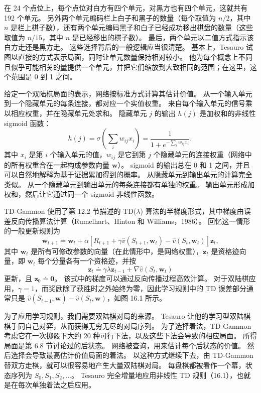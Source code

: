 \documentclass[UTF8,12pt,a4paper,fontset=fandol]{ctexart}
\begin{document}
在 24 个点位上，每个点位对白方有四个单元，对黑方也有四个单元，这就共有 192 个单元。
另外两个单元编码栏上白子和黑子的数量（每个取值为 $n/2$，其中 $n$ 是栏上棋子数），还有两个单元编码黑子和白子已经成功移出棋盘的数量（这些取值为 $n/15$，其中 $n$ 是已经移出的棋子数）。
最后，两个单元以二值方式指示该白方走还是黑方走。
这些选择背后的一般逻辑应当很清楚。
基本上，Tesauro 试图以直接的方式表示局面，同时让单元数量保持相对较小。
他为每个概念上不同且似乎可能相关的量提供一个单元，并把它们缩放到大致相同的范围；在这里，这个范围是 0 到 1 之间。

给定一个双陆棋局面的表示，网络按标准方式计算其估计价值。
从一个输入单元到一个隐藏单元的每条连接，都对应一个实值权重。
来自每个输入单元的信号乘以相应权重，并在隐藏单元处求和。
隐藏单元 $j$ 的输出 $h(j)$ 是加权和的非线性 sigmoid 函数：
\[
h(j)=\sigma\left(\sum_i w_{ij}x_i\right)
=\frac{1}{1+e^{-\sum_i w_{ij}x_i}},
\]
其中 $x_i$ 是第 $i$ 个输入单元的值，$w_{ij}$ 是它到第 $j$ 个隐藏单元的连接权重（网络中的所有权重合在一起构成参数向量 $\mathbf{w}$）。
sigmoid 的输出总在 0 和 1 之间，并且可以自然地解释为基于证据累加得到的概率。
从隐藏单元到输出单元的计算完全类似。
从一个隐藏单元到输出单元的每条连接都有单独的权重。
输出单元形成加权和，然后让它通过同一个 sigmoid 非线性函数。

TD-Gammon 使用了第 12.2 节描述的 TD($\lambda$) 算法的半梯度形式，其中梯度由误差反向传播算法计算（Rumelhart、Hinton 和 Williams，1986）。
回忆这一情形的一般更新规则为
\begin{equation}
\mathbf{w}_{t+1}\doteq \mathbf{w}_t+\alpha\left[R_{t+1}+\gamma\hat v(S_{t+1},\mathbf{w}_t)-\hat v(S_t,\mathbf{w}_t)\right]\mathbf{z}_t,
\tag{16.1}
\end{equation}
其中 $\mathbf{w}_t$ 是所有可修改参数的向量（在此情形中，是网络权重），$\mathbf{z}_t$ 是资格迹向量，即 $\mathbf{w}_t$ 每个分量各有一个资格迹，并按
\[
\mathbf{z}_t\doteq \gamma\lambda\mathbf{z}_{t-1}+\nabla\hat v(S_t,\mathbf{w}_t)
\]
更新，且 $\mathbf{z}_0\doteq \mathbf{0}$。
该式中的梯度可以通过反向传播过程高效计算。
对于双陆棋应用，$\gamma=1$，而奖励除了获胜时之外始终为零，因此学习规则中的 TD 误差部分通常只是 $\hat v(S_{t+1},\mathbf{w})-\hat v(S_t,\mathbf{w})$，如图 16.1 所示。

为了应用学习规则，我们需要双陆棋对局的来源。
Tesauro 让他的学习型双陆棋棋手同自己对弈，从而获得无穷无尽的对局序列。
为了选择着法，TD-Gammon 考虑它在一次掷骰下大约 20 种可行下法，以及这些下法会导致的相应局面。
所得局面是第 6.8 节讨论过的后状态。
网络被查询，用来估计每个后状态的价值。
然后选择会导致最高估计价值局面的着法。
以这种方式继续下去，由 TD-Gammon 替双方走棋，就可以很容易地产生大量双陆棋对局。
每盘棋都被看作一个幕，状态序列为 $S_0,S_1,S_2,\ldots$。
Tesauro 完全增量地应用非线性 TD 规则（16.1），也就是在每次单独着法之后应用。
\end{document}
